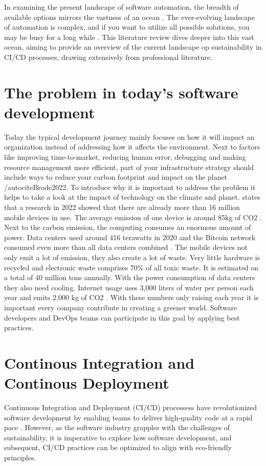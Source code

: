 
In examining the present landscape of software automation, the breadth of available options mirrors the vastness of an ocean \autocite{King2019}.
The ever-evolving landscape of automation is complex, and if you want to utilize all possible solutions, you may be busy for a long while \autocite{King2019}.
This literature review dives deeper into this vast ocean, aiming to provide an overview of the current landscape op sustainability in CI/CD processes, drawing extensively from professional literature.



\section{The problem in today's software development}
Today the typical development journey mainly focuses on how it will impact an organization instead of addressing how it affects the environment. Next to factors like improving time-to-market, reducing human error, debugging and making resource management more efficient, part of your infrastructure strategy should include ways to reduce your carbon footprint and impact on the planet /autocite{Brode2022}. 
To introduce why it is important to address the problem it helps to take a look at the impact of technology on the climate and planet. \textcite{Brode2022} states that a research in 2022 showed that there are already more than 16 million mobile devices in use. The average emission of one device is around 85kg of CO2 \autocite{Six2023}. Next to the carbon emission, the computing consumes an enormous amount of power. Data centers used around 416 terawatts in 2020 and the Bitcoin network consumed even more than all data centers combined \textcite{Brode2022}. 
 The mobile devices not only emit a lot of emission, they also create a lot of waste. Very little hardware is recycled and electronic waste comprises 70\% of all toxic waste. It is estimated on a total of 40 million tons annually. With the power consumption of data centers they also need cooling. Internet usage uses 3,000 liters of water per person each year and emits 2,000 kg of CO2 \autocite{Brode2022}.
With these numbers only raising each year it is important every company contribute in creating a greener world. Software developers and DevOps teams can participate in this goal by applying best practices. 



\section{Continous Integration and Continous Deployment}
Continuous Integration and Deployment (CI/CD) processess have revolutionized software development by enabling teams to deliver high-quality code at a rapid pace \autocite{Sacolick2024}.
However, as the software industry grapples with the challenges of sustainability, it is imperative to explore how software development, and subsequent, CI/CD practices can be optimized to align with eco-friendly principles.

